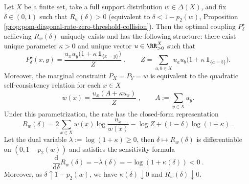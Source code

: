 \begin{theorem}\label{thm:pom-diagonal-rate-explicit-param-and-derivative}
Let \(X\) be a finite set, take a full support distribution \(w\in\Delta(X)\), and fix \(\delta\in(0,1)\) such that \(R_w(\delta)>0\) (equivalent to \(\delta<1-p_2(w)\), Proposition \ref{prop:pom-diagonal-rate-zero-threshold-collision}).
Then the optimal coupling \(P^\star_\delta\) achieving \(R_w(\delta)\) uniquely exists and has the following structure:
there exist unique parameter \(\kappa>0\) and unique vector \(u\in\RR_{>0}^X\) such that
\[
\boxed{\;
P^\star_\delta(x,y)=\frac{u_xu_y\bigl(1+\kappa\,\mathbf 1_{\{x=y\}}\bigr)}{Z}\;},
\qquad
Z=\sum_{a,b\in X}u_au_b\bigl(1+\kappa\,\mathbf 1_{\{a=b\}}\bigr).
\]
Moreover, the marginal constraint \(P_X=P_Y=w\) is equivalent to the quadratic self-consistency relation for each \(x\in X\)
\[
\boxed{\;
w(x)=\frac{u_x(A+\kappa u_x)}{Z}\;},
\qquad
A:=\sum_{y\in X}u_y.
\]
Under this parametrization, the rate has the closed-form representation
\[
\boxed{\;
R_w(\delta)
=2\sum_{x\in X}w(x)\log\frac{u_x}{w(x)}
-\log Z+(1-\delta)\log(1+\kappa)\; } .
\]
Let the dual variable \(\lambda:=\log(1+\kappa)\ge 0\), then \(\delta\mapsto R_w(\delta)\) is differentiable on \((0,1-p_2(w))\) and satisfies the sensitivity formula
\[
\boxed{\;
\frac{\mathrm d}{\mathrm d\delta}R_w(\delta)=-\lambda(\delta)=-\log(1+\kappa(\delta))<0\; } .
\]
Moreover, as \(\delta\uparrow 1-p_2(w)\), we have \(\kappa(\delta)\downarrow 0\) and \(R_w(\delta)\downarrow 0\).
\end{theorem}
